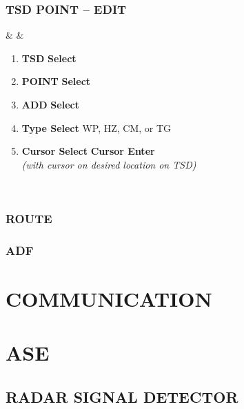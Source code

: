 \documentclass[fontHelvetica]{TechCheck}
\begin{document}
	\subsection{TSD POINT -- EDIT}
	\begin{listlongtable}
			\textbf{\textbullet} &  &
			\begin{minipage}[t]{\linewidth}
				\vspace{-7pt}
				\begin{enumerate}
					\item \textbf{TSD} \dotfill \textbf{Select}
					\item \textbf{POINT} \dotfill \textbf{Select}
					\item \textbf{ADD} \dotfill \textbf{Select}
					\item \textbf{Type Select} \dotfill WP, HZ, CM, or TG 
					\item \textbf{Cursor Select} \dotfill \textbf{Cursor Enter} \\
					\hfill \emph{(with cursor on desired location on TSD)}
				\end{enumerate}
			\end{minipage} \\
			\end{listlongtable}

	
	
	\subsection{ROUTE}

	\subsection{ADF}

	\cleardoublepage

	\chapter{COMMUNICATION}
	\minitoc
	\cleardoublepage

	\chapter{ASE}
	\minitoc
	\cleardoublepage

	
	\section{RADAR SIGNAL DETECTOR}
\end{document}
